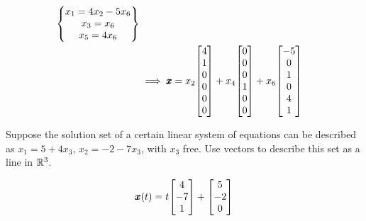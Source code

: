 \documentclass{../mathhomework}
\newenvironment{Mat}{\begin{bmatrix}}{\end{bmatrix}}
\begin{document}
\begin{problem}[1.5\#11]
\begin{solution}
\begin{align*}
            \begin{Bmatrix}
                x_1 = 4x_2 - 5x_6 \\
                x_3 = x_6 \\
                x_5 = 4x_6
            \end{Bmatrix} \\
            & \implies \Vect{x} = x_2\begin{Mat}4\\1\\0\\0\\0\\0\end{Mat} + x_4\begin{Mat}0\\0\\0\\1\\0\\0\end{Mat}  + x_6\begin{Mat}-5\\0\\1\\0\\4\\1\end{Mat}
        \end{align*}
    \end{solution}
\end{problem}

\begin{problem}[1.5\#13]
    Suppose the solution set of a certain linear system of equations can be described as $x_1 = 5 + 4x_3$, $x_2 = -2 -7x_3$, with $x_3$ free. Use vectors to describe this set as a line in $\mathbb{R}^3$.

    \begin{solution}
        \begin{equation*}
            \Vect{x}(t) = t\begin{Mat}4\\-7\\1\end{Mat} + \begin{Mat}5\\-2\\0\end{Mat}
        \end{equation*}
    \end{solution}
\end{problem}
\end{document}
